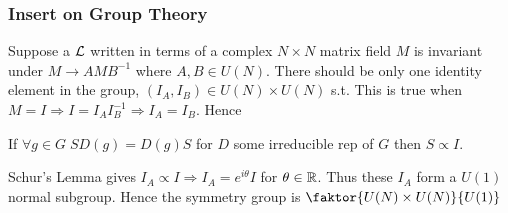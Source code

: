 \documentclass{article}
\begin{document}
\subsubsection*{Insert on Group Theory}
Suppose a $\mathcal{L}$ written in terms of a complex $N\times N$ matrix field $M$ is invariant under $M \to AMB^{-1}$ where $A,B \in U(N)$. There should be only one identity element in the group, $(I_A,I_B)\in U(N)\times U(N)$ s.t. 
This is true when $M=I \Rightarrow I=I_A I_B^{-1} \Rightarrow I_A = I_B$. Hence 
\begin{lemma}
If $\forall g \in G \; SD(g) = D(g) S$ for $D$ some irreducible rep of $G$ then $S \propto I$. 
\end{lemma}
Schur's Lemma gives $I_A \propto I \Rightarrow I_A = e^{i\theta} I$ for $\theta\in\mathbb{R}$. Thus these $I_A$ form a $U(1)$ normal subgroup. Hence the symmetry group is $\faktor{U(N)\times U(N)}{U(1)}$
\end{document}
